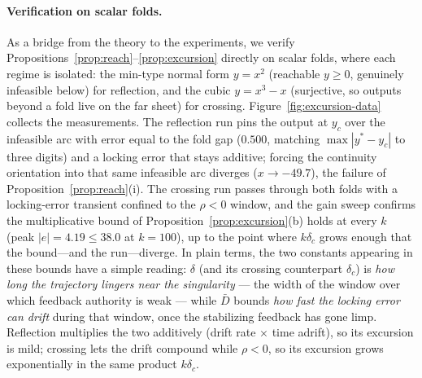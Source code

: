 \documentclass[11pt,american]{article}
\theoremstyle{definition}
\theoremstyle{plain}
\theoremstyle{remark}
\begin{document}
\paragraph{Verification on scalar folds.} As a bridge from the theory to the experiments, we verify Propositions~\ref{prop:reach}--\ref{prop:excursion} directly on scalar folds, where each regime is isolated: the min-type normal form $y=x^2$ (reachable $y\ge0$, genuinely infeasible below) for reflection, and the cubic $y=x^3-x$ (surjective, so outputs beyond a fold live on the far sheet) for crossing. Figure~\ref{fig:excursion-data} collects the measurements. The reflection run pins the output at $y_c$ over the infeasible arc with error equal to the fold gap ($0.500$, matching $\max|y^*-y_c|$ to three digits) and a locking error that stays additive; forcing the continuity orientation into that same infeasible arc diverges ($x\to-49.7$), the failure of Proposition~\ref{prop:reach}(i). The crossing run passes through both folds with a locking-error transient confined to the $\rho<0$ window, and the gain sweep confirms the multiplicative bound of Proposition~\ref{prop:excursion}(b) holds at every $k$ (peak $|e|=4.19\le38.0$ at $k=100$), up to the point where $k\delta_c$ grows enough that the bound---and the run---diverge. In plain terms, the two constants appearing in these bounds have a simple reading: $\delta$ (and its crossing counterpart $\delta_c$) is \emph{how long the trajectory lingers near the singularity} --- the width of the window over which feedback authority is weak --- while $\bar D$ bounds \emph{how fast the locking error can drift} during that window, once the stabilizing feedback has gone limp. Reflection multiplies the two additively (drift rate $\times$ time adrift), so its excursion is mild; crossing lets the drift compound while $\rho<0$, so its excursion grows exponentially in the same product $k\delta_c$.
\end{document}
